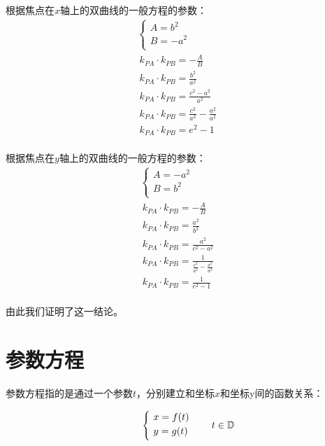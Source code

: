 \documentclass[UTF8]{ctexart}
\begin{document}
    根据焦点在$x$轴上的双曲线的一般方程的参数：\vspace{7pt}
    \begin{align}
        &\begin{cases}
            A=b^2\\[1mm]
            B=-a^2\\[1mm]
        \end{cases}\\[3mm]
        &~k_{PA}\cdot k_{PB}=-\frac{A}{B}\\[3mm]
        &~k_{PA}\cdot k_{PB}=\frac{b^2}{a^2}\\[3mm]
        &~k_{PA}\cdot k_{PB}=\frac{c^2-a^2}{a^2}\\[3mm]
        &~k_{PA}\cdot k_{PB}=\frac{c^2}{a^2}-\frac{a^2}{a^2}~~~~~~~~\\[3mm]
        &~k_{PA}\cdot k_{PB}=e^2-1
    \end{align}\\
    根据焦点在$y$轴上的双曲线的一般方程的参数：\vspace{7pt}
    \begin{align}
        &\begin{cases}
            A=-a^2\\[1mm]
            B=b^2\\[1mm]
        \end{cases}\\[3mm]
        &~k_{PA}\cdot k_{PB}=-\frac{A}{B}\\[3mm]
        &~k_{PA}\cdot k_{PB}=\frac{a^2}{b^2}\\[3mm]
        &~k_{PA}\cdot k_{PB}=\frac{a^2}{c^2-a^2}\\[3mm]
        &~k_{PA}\cdot k_{PB}=\frac{1}{\frac{c^2}{a^2}-\frac{a^2}{a^2}}~~~~~~~~\\[3mm]
        &~k_{PA}\cdot k_{PB}=\frac{1}{e^2-1}
    \end{align}\\
    由此我们证明了这一结论。

\newpage

\section{参数方程}
    参数方程指的是通过一个参数$t$，分别建立和坐标$x$和坐标y间的函数关系：\\
    \begin{large}
        \begin{equation*}
            ~~~~\begin{cases}
                ~x=f(t)\\
                ~y=g(t)\vspace{3pt}
            \end{cases}\quad t\in\mathbb{D}
        \end{equation*}
    \end{large}\\
\end{document}
